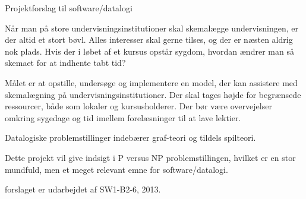 

Projektforslag til software/datalogi

Når man på store undervisningsinstitutioner skal skemalægge undervisningen, er der altid et stort bøvl. Alles interesser skal gerne tilses, og der er næsten aldrig nok plads. Hvis der i løbet af et kursus opstår sygdom, hvordan ændrer man så skemaet for at indhente tabt tid?

Målet er at opstille, undersøge og implementere en model, der kan assistere med skemalægning på undervisningsinstitutioner. Der skal tages højde for begrænsede ressourcer, både som lokaler og kursusholderer. Der bør være overvejelser omkring sygedage og tid imellem forelæsninger til at lave lektier.

Datalogiske problemstillinger indebærer graf-teori og tildels spilteori.

Dette projekt vil give indsigt i P versus NP problemstillingen, hvilket er en stor mundfuld, men et meget relevant emne for software/datalogi. 

forslaget er udarbejdet af SW1-B2-6, 2013.
